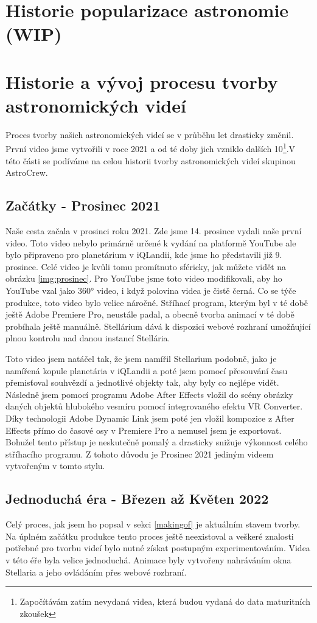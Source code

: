 \documentclass[12pt,a4paper,titlepage]{article}
\begin{document}
\section{Historie popularizace astronomie (WIP)}
\section{Historie a vývoj procesu tvorby astronomických videí}
Proces tvorby našich astronomických videí se v průběhu let drasticky změnil. První video jsme vytvořili v roce 2021 a od té doby jich vzniklo dalších 10\footnote{Započítávám zatím nevydaná videa, která budou vydaná do data maturitních zkoušek}.V této části se podíváme na celou historii tvorby astronomických videí skupinou AstroCrew.
\subsection{Začátky - Prosinec 2021}
Naše cesta začala v prosinci roku 2021. Zde jsme 14. prosince vydali naše první video. Toto video nebylo primárně určené k vydání na platformě YouTube ale bylo připraveno pro planetárium v iQLandii, kde jsme ho představili již 9. prosince. Celé video je kvůli tomu promítnuto sféricky, jak můžete vidět na obrázku \ref{img:prosinec}. Pro YouTube jsme toto video modifikovali, aby ho YouTube vzal jako 360° video, i když polovina videa je čistě černá. Co se týče produkce, toto video bylo velice náročné. Stříhací program, kterým byl v té době ještě Adobe Premiere Pro, neustále padal, a obecně tvorba animací v té době probíhala ještě manuálně. Stellárium dává k dispozici webové rozhraní umožňující plnou kontrolu nad danou instancí Stellária. 

Toto video jsem natáčel tak, že jsem namířil Stellarium podobně, jako je namířená kopule planetária v iQLandii a poté jsem pomocí přesouvání času přemisťoval souhvězdí a jednotlivé objekty tak, aby byly co nejlépe vidět. Následně jsem pomocí programu Adobe After Effects vložil do scény obrázky daných objektů hlubokého vesmíru pomocí integrovaného efektu VR Converter. Díky technologii Adobe Dynamic Link jsem poté jen vložil kompozice z After Effects přímo do časové osy v Premiere Pro a nemusel jsem je exportovat. Bohužel tento přístup je neskutečně pomalý a drasticky snižuje výkonnost celého stříhacího programu. Z tohoto důvodu je Prosinec 2021 jediným videem vytvořeným v tomto stylu.
\subsection{Jednoduchá éra - Březen až Květen 2022}
Celý proces, jak jsem ho popsal v sekci \ref{makingof} je aktuálním stavem tvorby. Na úplném začátku produkce tento proces ještě neexistoval a veškeré znalosti potřebné pro tvorbu  videí bylo nutné získat postupným experimentováním. Videa v této éře byla velice jednoduchá. Animace byly vytvořeny nahráváním okna Stellaria a jeho ovládáním přes webové rozhraní. 
\end{document}

